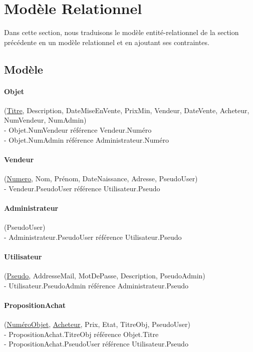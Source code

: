 \documentclass{article}
\begin{document}
\newpage 

\section{Modèle Relationnel}
Dans cette section, nous traduisons le modèle entité-relationnel de la section précédente en un modèle relationnel et en ajoutant ses contraintes.

\subsection{Modèle}

\indent

\paragraph{Objet} (\underline{Titre}, Description, DateMiseEnVente, PrixMin, Vendeur, DateVente, Acheteur, NumVendeur, NumAdmin)\\
\indent - Objet.NumVendeur référence Vendeur.Numéro\\
\indent - Objet.NumAdmin référence Administrateur.Numéro


\paragraph{Vendeur} (\underline{Numero}, Nom, Prénom, DateNaissance, Adresse, PseudoUser)\\
\indent - Vendeur.PseudoUser référence Utilisateur.Pseudo


\paragraph{Administrateur} (PseudoUser)\\
\indent - Administrateur.PseudoUser référence Utilisateur.Pseudo


\paragraph{Utilisateur} (\underline{Pseudo}, AddresseMail, MotDePasse, 
Description, PseudoAdmin)\\
\indent - Utilisateur.PseudoAdmin référence Administrateur.Pseudo


\paragraph{PropositionAchat} (\underline{NuméroObjet}, \underline{Acheteur}, Prix, Etat, TitreObj, PseudoUser)\\
\indent - PropositionAchat.TitreObj référence Objet.Titre\\
\indent - PropositionAchat.PseudoUser référence Utilisateur.Pseudo
\end{document}
